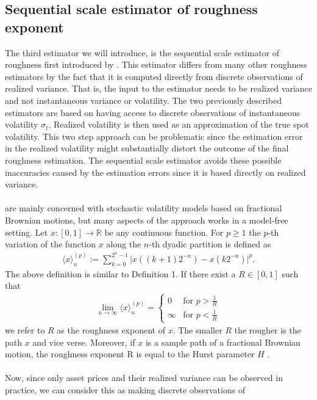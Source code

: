 \documentclass{article}
\begin{document}
\subsection{Sequential scale estimator of roughness exponent}
The third estimator we will introduce, is the sequential scale estimator of roughness first introduced by \cite{han}. This estimator differs from many other roughness estimators by the fact that it is computed directly from discrete observations of realized variance. That is, the input to the estimator needs to be realized variance and not instantaneous variance or volatility. The two previously described estimators are based on having access to discrete observations of instantaneous volatility $\sigma_t$. Realized volatility is then used as an approximation of the true spot volatility. This two step approach can be problematic since the estimation error in the realized volatility might substantially distort the outcome of the final roughness estimation. The sequential scale estimator avoids these possible inaccuracies caused by the estimation errors since it is based directly on realized variance.\\\\
\cite{han} are mainly concerned with stochastic volatility models based on fractional Brownian motions, but many aspects of the approach works in a model-free setting. Let $x: [0,1] \rightarrow \mathbb{R}$ be any continuous function. For $p\geq 1$ the $p$-th variation of the function $x$ along the $n$-th dyadic partition is defined as
\begin{align*}
\langle x \rangle^{(p)}_n := \sum_{k=0}^{2^n-1} \lvert x((k+1)2^{-n})-x(k2^{-n})\rvert^p.
\end{align*}
The above definition is similar to Definition 1. If there exist a $R\in [0,1]$ such that
\begin{align*}
\lim_{n\rightarrow\infty}\langle x \rangle^{(p)}_n =
\begin{cases} 
0 & \text{for } p > \frac{1}{R} \\
\infty & \text{for } p < \frac{1}{R}
\end{cases}
\end{align*}
we refer to $R$ as the roughness exponent of $x$. The smaller $R$ the rougher is the path $x$ and vice verse. Moreover, if $x$ is a sample path of a fractional Brownian motion, the roughness exponent R is equal to the Hurst parameter $H$ \cite{han}.\\\\
Now, since only asset prices and their realized variance can be observed in practice, we can consider this as making discrete observations of
\end{document}
